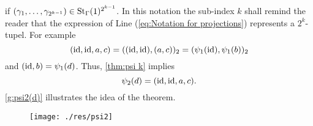 if $(\gamma_1,\ldots,\gamma_{2^{k-1}})\in\St[\Gamma]{1}^{2^{k-1}}$. In this notation the sub-index $k$ shall remind the reader that the expression of Line (\ref{eq:Notation for projections}) represents a $2^k$-tupel. For example
\begin{equation*}
(\id,\id,a,c)=((\id,\id),(a,c))_2=(\psi_1(\id),\psi_1(b))_2
\end{equation*}
and $(\id,b)=\psi_1(d)$. Thus, \cref{thm:psi k} implies 
\begin{equation*}
\psi_2(d)=(\id,\id,a,c).
\end{equation*}
\cref{g:psi2(d)} illustrates the idea of the theorem. 
\begin{figure}
\begin{center}
\texttt{[image: ./res/psi2]}
%
%
%
%
%
%
%
%

\end{center}
\end{figure}
